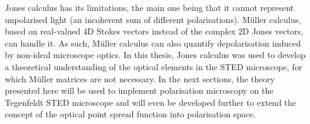 Jones calculus has its limitations, the main one being that it cannot represent unpolarised light (an incoherent sum of different polarisations). Müller calculus, based on real-valued 4D Stokes vectors instead of the complex 2D Jones vectors, can handle it. As such, Müller calculus can also quantify depolarisation induced by non-ideal microscope optics. In this thesis, Jones calculus was used to develop a theoretical understanding of the optical elements in the STED microscope, for which Müller matrices are not necessary. In the next sections, the theory presented here will be used to implement polarisation microscopy on the Tegenfeldt STED microscope and will even be developed further to extend the concept of the optical point spread function into polarisation space.
